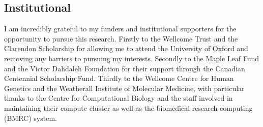 \subsection*{Institutional}
I am incredibly grateful to my funders and institutional supporters for the opportunity to pursue this research. Firstly to the Wellcome Trust and the Clarendon Scholarship for allowing me to attend the University of Oxford and removing any barriers to pursuing my interests. Secondly to the Maple Leaf Fund and the Victor Dahdaleh Foundation for their support through the Canadian Centennial Scholarship Fund. Thirdly to the Wellcome Centre for Human Genetics and the Weatherall Institute of Molecular Medicine, with particular thanks to the Centre for Computational Biology and the staff involved in maintaining their compute cluster as well as the biomedical research computing (BMRC) system.
